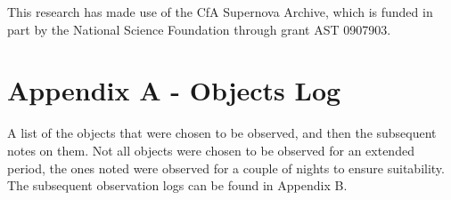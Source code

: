 \documentclass[twocolumn]{revtex4}
\begin{document}
This research has made use of the CfA Supernova Archive, which is funded in part by the National Science Foundation through grant AST 0907903.




\clearpage
\onecolumngrid
\vspace{-3ex}
\section*{Appendix A - Objects Log} \label{objectslog}
\vspace{-2ex}
A list of the objects that were chosen to be observed, and then the subsequent notes on them. Not all objects were chosen to be observed for an extended period, the ones noted were observed for a couple of nights to ensure suitability. The subsequent observation logs can be found in Appendix B.
\end{document}
